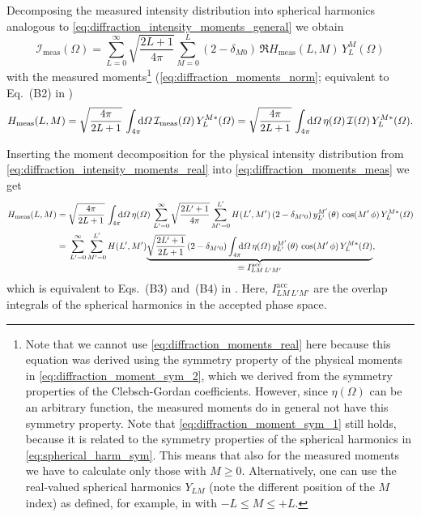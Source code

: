Decomposing the measured intensity distribution into spherical
harmonics analogous to \cref{eq:diffraction_intensity_moments_general}
we obtain
\begin{equation}
  \mathcal{I}_\text{meas}(\Omega)
  = \sum_{L = 0}^\infty \sqrt{\frac{2 L + 1}{4 \pi}} \sum_{M = 0}^{L} (2 - \delta_{M 0})\, \Re{H_\text{meas}(L, M)\, Y_L^M(\Omega)}
\end{equation}
with the measured
moments\footnote{\label{fn:complex_moment_decomp}Note that we cannot
use \cref{eq:diffraction_moments_real} here because this equation was
derived using the symmetry property of the physical moments in
\cref{eq:diffraction_moment_sym_2}, which we derived from the symmetry
properties of the Clebsch-Gordan coefficients.  However, since
$\eta(\Omega)$ can be an arbitrary function, the measured moments do
in general not have this symmetry property.  Note that
\cref{eq:diffraction_moment_sym_1} still holds, because it is related
to the symmetry properties of the spherical harmonics in
\cref{eq:spherical_harm_sym}.  This means that also for the measured
moments we have to calculate only those with $M \geq 0$.
Alternatively, one can use the real-valued spherical harmonics $Y_{L
M}$ (note the different position of the $M$ index) as defined, for
example, in  with $-L
\leq M \leq +L$.} (\confer \cref{eq:diffraction_moments_norm};
equivalent to Eq.~(B2) in )
\begin{equation}
  \label{eq:diffraction_moments_meas}
  H_\text{meas}(L, M)
  = \sqrt{\frac{4 \pi}{2 L + 1}}\, \int_{4 \pi}\!\!\! \dif{\Omega}\, \mathcal{I}_\text{meas}(\Omega)\, Y_L^{M *}(\Omega)
  = \sqrt{\frac{4 \pi}{2 L + 1}}\, \int_{4 \pi}\!\!\! \dif{\Omega}\, \eta(\Omega)\, \mathcal{I}(\Omega)\, Y_L^{M *}(\Omega).
\end{equation}

Inserting the moment decomposition for the physical intensity distribution
from \cref{eq:diffraction_intensity_moments_real} into
\cref{eq:diffraction_moments_meas} we get
\begin{align}
  H_\text{meas}(L, M)
  ={}& \sqrt{\frac{4 \pi}{2 L + 1}}\, \int_{4 \pi}\!\!\! \dif{\Omega}\, \eta(\Omega)\,
  \sum_{L' = 0}^\infty \sqrt{\frac{2 L' + 1}{4 \pi}} \sum_{M' = 0}^{L'} H(L', M')\, (2 - \delta_{M' 0})\, y_{L'}^{M'}(\theta)\, \cos(M'\, \phi)\,
  Y_L^{M *}(\Omega) \notag \\
  \label{eq:diffraction_moments_meas2}
  ={}& \sum_{L' = 0}^\infty \sum_{M' = 0}^{L'} H(L', M')
  \dUnderbrace{\sqrt{\frac{2 L' + 1}{2 L + 1}}\, (2 - \delta_{M' 0}) \int_{4 \pi}\!\!\! \dif{\Omega}\, \eta(\Omega)\,
  y_{L'}^{M'}(\theta)\, \cos(M'\, \phi)\, Y_L^{M *}(\Omega)}{\equiv I^\text{acc}_{L M\, L' M'}},
\end{align}
which is equivalent to Eqs.~(B3) and~(B4) in .
Here, $I^\text{acc}_{L M\, L' M'}$ are the overlap integrals of the
spherical harmonics in the accepted phase space.

